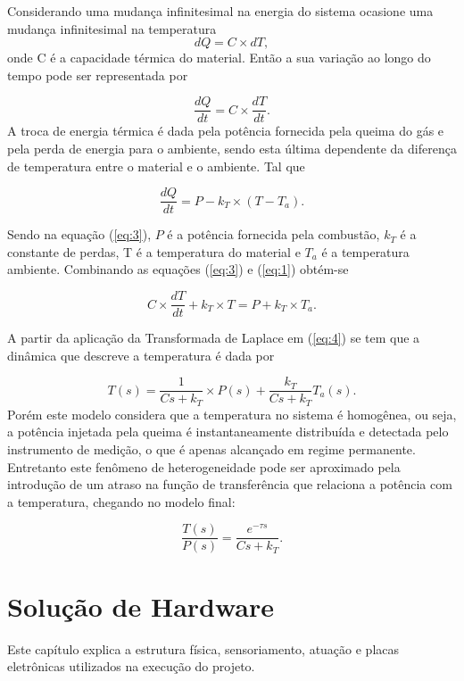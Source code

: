 Considerando uma mudança infinitesimal na energia do sistema ocasione uma mudança infinitesimal na temperatura
 \begin{equation}
	\label{eq:1}
	dQ = C \times dT,
\end{equation}
onde C é a capacidade térmica do material. Então a sua variação ao longo do tempo pode ser representada por

\begin{equation}
	\label{eq:2}
	\frac{dQ}{dt} =C \times \frac{dT}{dt}.
\end{equation}
A troca de energia térmica é dada pela potência fornecida pela queima do gás e pela perda de energia para o ambiente, sendo esta última dependente da diferença de temperatura entre o material e o ambiente. Tal que

\begin{equation}
	\label{eq:3}
	\frac{dQ}{dt} =P-k_T \times (T-T_a).
\end{equation}

Sendo na equação (\ref{eq:3}), $P$ é a potência fornecida pela combustão, $k_T$ é a constante de perdas, T é a temperatura do material e $T_a$ é a temperatura ambiente. Combinando as equações (\ref{eq:3}) e (\ref{eq:1}) obtém-se


\begin{equation}
	\label{eq:4}
	C \times\frac{dT}{dt}+k_T\times T=P+k_T\times T_a.
\end{equation}

A partir da aplicação da Transformada de Laplace em  (\ref{eq:4}) se tem que a dinâmica que descreve a temperatura é dada por

\begin{equation}
	\label{eq:5}
	T(s)=\frac{1}{Cs+k_T}\times P(s) + \frac{k_T}{Cs+k_T}T_a(s).
\end{equation}
Porém este modelo considera que a temperatura no sistema é homogênea, ou seja, a potência injetada pela queima é instantaneamente distribuída e detectada pelo instrumento de medição, o que é apenas alcançado em regime permanente. Entretanto este fenômeno de heterogeneidade pode ser aproximado pela introdução de um atraso na função de transferência que relaciona a potência com a temperatura, chegando no modelo final:

\begin{equation}
	\label{eq:6}
	\frac{T(s)}{P(s)}=\frac{e^{-\tau s}}{Cs+k_T}.
\end{equation}
	\chapter{Solução de Hardware}
Este capítulo explica a estrutura física, sensoriamento, atuação e placas eletrônicas utilizados na execução do projeto.


